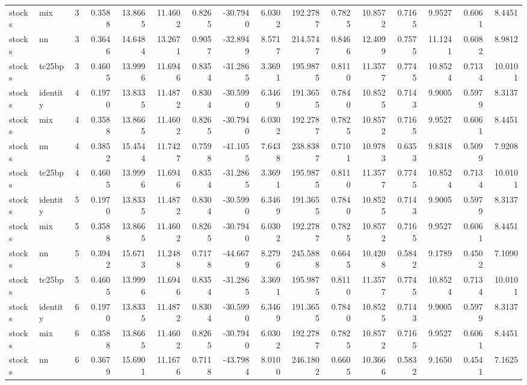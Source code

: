 \begin{tabular}{llrrrrrrrrrrrrrr}
stocks & mix & 3 & 0.3588 & 13.8665 & 11.4602 & 0.8265 & -30.7940 & 6.0302 & 192.2787 & 0.7825 & 10.8572 & 0.7165 & 9.9527 & 0.6061 & 8.4451 \\
stocks & nn & 3 & 0.3646 & 14.6484 & 13.2671 & 0.9057 & -32.8949 & 8.5717 & 214.5747 & 0.8466 & 12.4099 & 0.7575 & 11.1241 & 0.6082 & 8.9812 \\
stocks & tc25bp & 3 & 0.4605 & 13.9996 & 11.6946 & 0.8354 & -31.2865 & 3.3691 & 195.9875 & 0.8110 & 11.3577 & 0.7745 & 10.8524 & 0.7134 & 10.0101 \\
stocks & identity & 4 & 0.1970 & 13.8335 & 11.4872 & 0.8304 & -30.5990 & 6.3469 & 191.3655 & 0.7840 & 10.8525 & 0.7143 & 9.9005 & 0.5979 & 8.3137 \\
stocks & mix & 4 & 0.3588 & 13.8665 & 11.4602 & 0.8265 & -30.7940 & 6.0302 & 192.2787 & 0.7825 & 10.8572 & 0.7165 & 9.9527 & 0.6061 & 8.4451 \\
stocks & nn & 4 & 0.3852 & 15.4544 & 11.7427 & 0.7598 & -41.1055 & 7.6438 & 238.8387 & 0.7101 & 10.9783 & 0.6353 & 9.8318 & 0.5099 & 7.9208 \\
stocks & tc25bp & 4 & 0.4605 & 13.9996 & 11.6946 & 0.8354 & -31.2865 & 3.3691 & 195.9875 & 0.8110 & 11.3577 & 0.7745 & 10.8524 & 0.7134 & 10.0101 \\
stocks & identity & 5 & 0.1970 & 13.8335 & 11.4872 & 0.8304 & -30.5990 & 6.3469 & 191.3655 & 0.7840 & 10.8525 & 0.7143 & 9.9005 & 0.5979 & 8.3137 \\
stocks & mix & 5 & 0.3588 & 13.8665 & 11.4602 & 0.8265 & -30.7940 & 6.0302 & 192.2787 & 0.7825 & 10.8572 & 0.7165 & 9.9527 & 0.6061 & 8.4451 \\
stocks & nn & 5 & 0.3942 & 15.6713 & 11.2488 & 0.7178 & -44.6679 & 8.2796 & 245.5888 & 0.6645 & 10.4208 & 0.5842 & 9.1789 & 0.4502 & 7.1090 \\
stocks & tc25bp & 5 & 0.4605 & 13.9996 & 11.6946 & 0.8354 & -31.2865 & 3.3691 & 195.9875 & 0.8110 & 11.3577 & 0.7745 & 10.8524 & 0.7134 & 10.0101 \\
stocks & identity & 6 & 0.1970 & 13.8335 & 11.4872 & 0.8304 & -30.5990 & 6.3469 & 191.3655 & 0.7840 & 10.8525 & 0.7143 & 9.9005 & 0.5979 & 8.3137 \\
stocks & mix & 6 & 0.3588 & 13.8665 & 11.4602 & 0.8265 & -30.7940 & 6.0302 & 192.2787 & 0.7825 & 10.8572 & 0.7165 & 9.9527 & 0.6061 & 8.4451 \\
stocks & nn & 6 & 0.3679 & 15.6901 & 11.1676 & 0.7118 & -43.7984 & 8.0100 & 246.1802 & 0.6605 & 10.3666 & 0.5832 & 9.1650 & 0.4541 & 7.1625 \\

\end{tabular}
